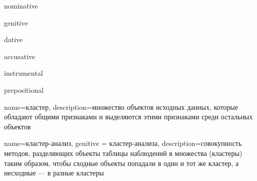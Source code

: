 \glsaddkey
{nominative}%
{}%
{\glsentrynominative}%
{\Glsentrynominative}%
{\glsnom}%
{\Glsnom}%
{\GLSnom}%

\glsaddkey
{genitive}%
{}%
{\glsentrygenitive}%
{\Glsentrygenitive}%
{\glsgen}%
{\Glsgen}%
{\GLSgen}%


\glsaddkey
{dative}%
{}%
{\glsentrydative}%
{\Glsentrydative}%
{\glsdat}%
{\Glsdat}%
{\GLSdat}%


\glsaddkey
{accusative}%
{}%
{\glsentryaccusative}%
{\Glsentryaccusative}%
{\glsacc}%
{\Glsacc}%
{\GLSacc}%

\glsaddkey
{instrumental}%
{}%
{\glsentryinstrumental}%
{\Glsentryinstrumental}%
{\glsins}%
{\Glsins}%
{\GLSins}%

\glsaddkey
{prepositional}%
{}%
{\glsentryprepositional}%
{\Glsentryprepositional}%
{\glspre}%
{\Glspre}%
{\GLSpre}%





{
	name=кластер,
	description={множество объектов исходных данных, которые обладают общими признаками и выделяются этими признаками среди остальных объектов}
}


{
	name=кластер-анализ,
	genitive = кластер-анализа,
	description={совокупность методов, разделяющих объекты таблицы наблюдений в множества (кластеры) таким образом, чтобы сходные объекты попадали в один и тот же кластер, а несходные --- в разные кластеры \cite{data-science}}
}

